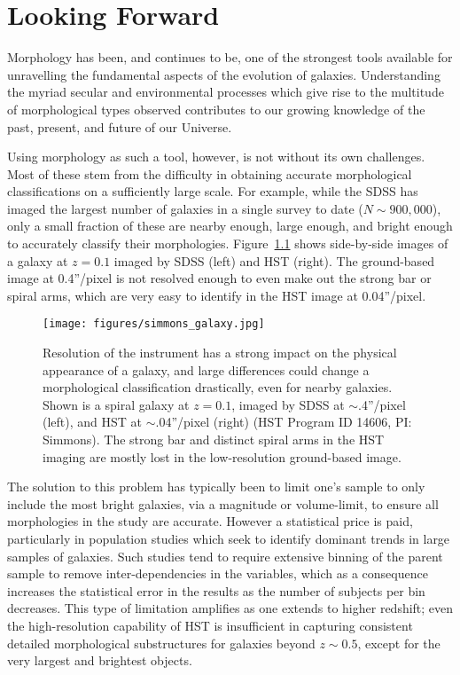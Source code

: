 \chapter{Looking Forward}
\label{summary_chapter}

Morphology has been, and continues to be, one of the strongest tools available for unravelling the fundamental aspects of the evolution of galaxies. Understanding the myriad secular and environmental processes which give rise to the multitude of morphological types observed contributes to our growing knowledge of the past, present, and future of our Universe.

Using morphology as such a tool, however, is not without its own challenges. Most of these stem from the difficulty in obtaining accurate morphological classifications on a sufficiently large scale. For example, while the SDSS has imaged the largest number of galaxies in a single survey to date ($N \sim 900,000$), only a small fraction of these are nearby enough, large enough, and bright enough to accurately classify their morphologies. Figure~\ref{fig:simmonsgal} shows side-by-side images of a galaxy at $z=0.1$ imaged by SDSS (left) and HST (right). The ground-based image at 0.4''/pixel is not resolved enough to even make out the strong bar or spiral arms, which are very easy to identify in the HST image at 0.04''/pixel.  
 
\begin{figure}
\centering
\texttt{[image: figures/simmons\_galaxy.jpg]}
\caption{Resolution of the instrument has a strong impact on the physical appearance of a galaxy, and large differences could change a morphological classification drastically, even for nearby galaxies. Shown is a spiral galaxy at $z=0.1$, imaged by SDSS at $\sim$.4''/pixel (left), and HST at $\sim$.04''/pixel (right) (HST Program ID 14606, PI: Simmons). The strong bar and distinct spiral arms in the HST imaging are mostly lost in the low-resolution ground-based image. }
\label{fig:simmonsgal}
\end{figure}

The solution to this problem has typically been to limit one's sample to only include the most bright galaxies, via a magnitude or volume-limit, to ensure all morphologies in the study are accurate. However a statistical price is paid, particularly in population studies which seek to identify dominant trends in large samples of galaxies. Such studies tend to require extensive binning of the parent sample to remove inter-dependencies in the variables, which as a consequence increases the statistical error in the results as the number of subjects per bin decreases. This type of limitation amplifies as one extends to higher redshift; even the high-resolution capability of HST is insufficient in capturing consistent detailed morphological substructures for galaxies beyond $z\sim0.5$, except for the very largest and brightest objects.

